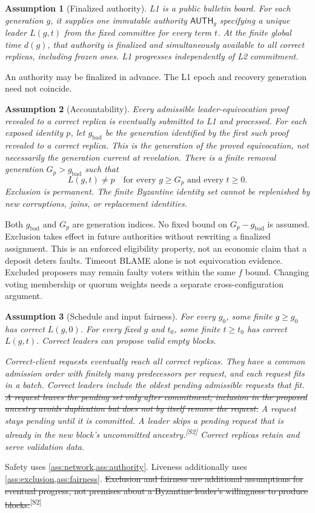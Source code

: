 \documentclass[11pt,a4paper]{article}
\newcommand{\NEW}[1]{{\color{diffNew}#1}}
\newcommand{\DEL}[1]{{\color{diffDel}\sout{#1}}}
\newcommand{\CH}[1]{\textsuperscript{\color{diffNew}\sffamily\scriptsize[#1]}}
\newcommand{\NEW}[1]{#1}
\newcommand{\DEL}[1]{}
\newcommand{\CH}[1]{}
\newcommand{\tagg}[1]{\ensuremath{\mathsf{#1}}}
\newtheorem{assumption}[assumption]{Assumption}
\begin{document}
\begin{assumption}[Finalized authority]
\label{ass:authority}
L1 is a public bulletin board. For each generation $g$, it supplies one
immutable authority $\tagg{AUTH}_g$ specifying a unique leader $L(g,t)$
from the fixed committee for every term $t$. At the finite global time
$d(g)$, that authority is finalized and simultaneously available to all
correct replicas, including frozen ones. L1 progresses independently
of L2 commitment.
\end{assumption}
An authority may be finalized in advance. The L1 epoch and recovery
generation need not coincide.

\begin{assumption}[Accountability]
\label{ass:exclusion}
Every admissible leader-equivocation proof revealed to a correct replica
is eventually submitted to L1 and processed. For each exposed identity $p$,
let $g_{\mathrm{bad}}$ be the generation identified by the first such proof
revealed to a correct replica. This is the generation of the proved
equivocation, not necessarily the generation current at revelation.
There is a finite removal generation $G_p>g_{\mathrm{bad}}$ such that
\[
 L(g,t)\ne p\quad\text{for every }g\ge G_p\text{ and every }t\ge0.
\]
Exclusion is permanent. The finite Byzantine identity set cannot be
replenished by new corruptions, joins, or replacement identities.
\end{assumption}
Both $g_{\mathrm{bad}}$ and $G_p$ are generation indices. No fixed bound
on $G_p-g_{\mathrm{bad}}$ is assumed. Exclusion takes effect in future
authorities without rewriting a finalized assignment.
This is an enforced eligibility property, not an economic claim that a
deposit deters faults. Timeout BLAME alone is not equivocation evidence.
Excluded proposers may remain faulty voters within the same $f$ bound.
Changing voting membership or quorum weights needs a separate
cross-configuration argument.

\begin{assumption}[Schedule and input fairness]
\label{ass:fairness}
For every $g_0$, some finite $g\ge g_0$ has correct $L(g,0)$.
For every fixed $g$ and $t_0$, some finite $t\ge t_0$ has correct $L(g,t)$.
Correct leaders can propose valid empty blocks.

Correct-client requests eventually reach all correct replicas. They have
a common admission order with finitely many predecessors per request, and
each request fits in a batch. Correct leaders include the oldest pending
admissible requests that fit. \DEL{A request leaves the pending set only
after commitment; inclusion in the proposed ancestry avoids duplication but
does not by itself remove the request.} \NEW{A request stays pending until
it is committed. A leader skips a pending request that is already in the
new block's uncommitted ancestry.}\CH{S2} Correct replicas retain and serve
validation data.
\end{assumption}
Safety uses \cref{ass:network,ass:authority}. \NEW{Liveness additionally
uses \cref{ass:exclusion,ass:fairness}.} \DEL{Exclusion and fairness are
additional assumptions for eventual progress, not premises about a
Byzantine leader's willingness to produce blocks.}\CH{S2}
\end{document}
